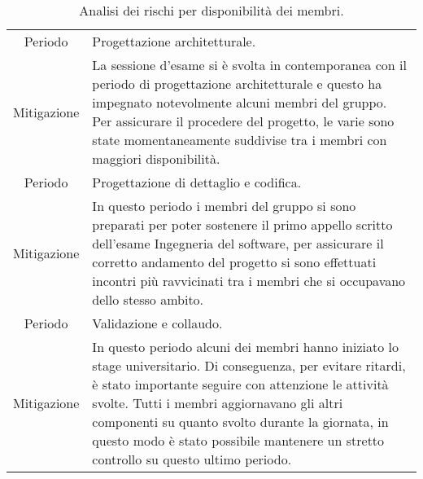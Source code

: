 \begin{table}[H]
	\centering
	\begin{tabular}{|c|p{11.5cm}|}
	\rowcolor{darkblue} \hline
	\multicolumn{2}{|c|}{\textcolor{white}{\textbf{RG2 - Disponibilità dei membri}}}\\ \hline
	Periodo & Progettazione architetturale.\\ \hline
	Mitigazione & La sessione d'esame si è svolta in contemporanea con il periodo di progettazione architetturale e questo ha impegnato notevolmente alcuni membri del gruppo. Per assicurare il procedere del progetto, le varie \glo{attività} sono state momentaneamente suddivise tra i membri con maggiori disponibilità.\\ \hline
	Periodo & Progettazione di dettaglio e codifica.\\ \hline
	Mitigazione & In questo periodo i membri del gruppo si sono preparati per poter sostenere il primo appello scritto dell'esame Ingegneria del software, per assicurare il corretto andamento del progetto si sono effettuati incontri più ravvicinati tra i membri che si occupavano dello stesso ambito.\\ \hline
	Periodo & Validazione e collaudo.\\ \hline
	Mitigazione & In questo periodo alcuni dei membri hanno iniziato lo stage universitario. Di conseguenza, per evitare ritardi, è stato importante seguire con attenzione le attività svolte. Tutti i membri aggiornavano gli altri componenti su quanto svolto durante la giornata, in questo modo è stato possibile mantenere un stretto controllo su questo ultimo periodo.\\ \hline
	\end{tabular}
	\caption{\label{tab:ARG2}Analisi dei rischi per disponibilità dei membri.}
\end{table}
